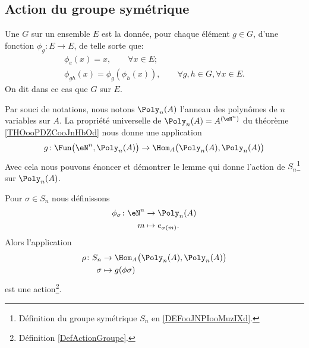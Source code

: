 \subsection{Action du groupe symétrique}

\begin{definition}  \label{DefActionGroupe}
	Une  \( G\) sur un ensemble \( E\) est la donnée, pour chaque élément \( g \in G\), d'une fonction \(\phi_g : E \to E \), de telle sorte que:
	\begin{gather*}
		\phi_{e}(x) = x, \hspace{2em} \forall x \in E;\\
		\phi_{gh}(x) = \phi_g (\phi_h (x)),  \hspace{2em} \forall g,h \in G, \forall x \in E.
	\end{gather*}
	On dit dans ce cas que \( G \)  sur \( E \).
\end{definition}

Par souci de notations, nous notons \( \Poly_n(A)\) l'anneau des polynômes de \( n\) variables sur \( A\). La propriété universelle de \( \Poly_n(A)=A^{(\eN^n)}\) du théorème \ref{THOooPDZCooJnHbOd} nous donne une application
\begin{equation}
	g\colon \Fun\big(\eN^n,\Poly_n(A)\big)\to \Hom_A\big( \Poly_n(A),\Poly_n(A) \big)
\end{equation}
Avec cela nous pouvons énoncer et démontrer le lemme qui donne l'action de \( S_n\)\footnote{Définition du groupe symétrique \( S_n\) en \ref{DEFooJNPIooMuzIXd}.} sur \( \Poly_n(A)\).

\begin{lemma}       \label{LEMooIRVQooHvoNBq}
	Pour \( \sigma\in S_n\) nous définissons
	\begin{equation}
		\begin{aligned}
			\phi_{\sigma}\colon \eN^n & \to \Poly_n(A)         \\
			m                         & \mapsto e_{\sigma(m)}.
		\end{aligned}
	\end{equation}
	Alors l'application
	\begin{equation}
		\begin{aligned}
			\rho\colon S_n & \to \Hom_A\big( \Poly_n(A),\Poly_n(A) \big) \\
			\sigma         & \mapsto g(\phi{\sigma})
		\end{aligned}
	\end{equation}
	est une action\footnote{Définition \ref{DefActionGroupe}.}.
\end{lemma}

